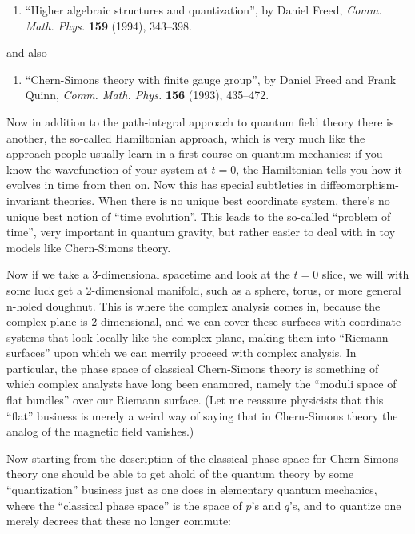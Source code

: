 \documentclass{article}
\def\tightlist{}
\begin{document}
\begin{enumerate}
\def\labelenumi{\arabic{enumi})}
\setcounter{enumi}{1}
\tightlist
\item
  ``Higher algebraic structures and quantization'', by Daniel Freed,
  \emph{Comm. Math. Phys.} \textbf{159} (1994), 343--398.
\end{enumerate}

and also

\begin{enumerate}
\def\labelenumi{\arabic{enumi})}
\setcounter{enumi}{2}
\tightlist
\item
  ``Chern-Simons theory with finite gauge group'', by Daniel Freed and
  Frank Quinn, \emph{Comm. Math. Phys.} \textbf{156} (1993), 435--472.
\end{enumerate}

Now in addition to the path-integral approach to quantum field theory
there is another, the so-called Hamiltonian approach, which is very much
like the approach people usually learn in a first course on quantum
mechanics: if you know the wavefunction of your system at \(t = 0\), the
Hamiltonian tells you how it evolves in time from then on. Now this has
special subtleties in diffeomorphism-invariant theories. When there is
no unique best coordinate system, there's no unique best notion of
``time evolution''. This leads to the so-called ``problem of time'',
very important in quantum gravity, but rather easier to deal with in toy
models like Chern-Simons theory.

Now if we take a 3-dimensional spacetime and look at the \(t = 0\)
slice, we will with some luck get a 2-dimensional manifold, such as a
sphere, torus, or more general n-holed doughnut. This is where the
complex analysis comes in, because the complex plane is 2-dimensional,
and we can cover these surfaces with coordinate systems that look
locally like the complex plane, making them into ``Riemann surfaces''
upon which we can merrily proceed with complex analysis. In particular,
the phase space of classical Chern-Simons theory is something of which
complex analysts have long been enamored, namely the ``moduli space of
flat bundles'' over our Riemann surface. (Let me reassure physicists
that this ``flat'' business is merely a weird way of saying that in
Chern-Simons theory the analog of the magnetic field vanishes.)

Now starting from the description of the classical phase space for
Chern-Simons theory one should be able to get ahold of the quantum
theory by some ``quantization'' business just as one does in elementary
quantum mechanics, where the ``classical phase space'' is the space of
\(p\)'s and \(q\)'s, and to quantize one merely decrees that these no
longer commute:
\end{document}
